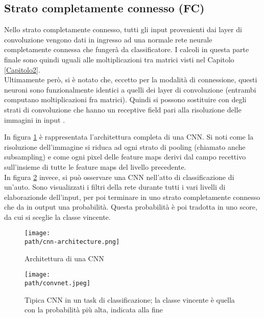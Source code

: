 \subsection{Strato completamente connesso (FC)}
Nello strato completamente connesso, tutti gli input provenienti dai layer di convoluzione vengono dati in ingresso ad una normale rete neurale completamente connessa che fungerà da classificatore. I calcoli in questa parte finale sono quindi uguali alle moltiplicazioni tra matrici visti nel Capitolo \ref{Capitolo2}. \\
Ultimamente però, si è notato che, eccetto per la modalità di connessione, questi neuroni sono funzionalmente identici a quelli dei layer di convoluzione (entrambi computano moltiplicazioni fra matrici). Quindi si possono sostituire con degli strati di convoluzione che hanno un receptive field pari alla risoluzione delle immagini in input \parencite{WCS231layer}. 

In figura \ref{fig:cnn4} è rappresentata l'architettura completa di una CNN. Si noti come la risoluzione dell'immagine si riduca ad ogni strato di pooling (chiamato anche subsampling) e come ogni pixel delle feature maps derivi dal campo recettivo sull'insieme di tutte le feature maps del livello precedente. \\
In figura \ref{fig:cnn3} invece, si può osservare una CNN nell'atto di classificazione di un'auto. Sono visualizzati i filtri della rete durante tutti i vari livelli di elaborazionde dell'input, per poi terminare in uno strato completamente connesso che da in output una probabilità. Questa probabilità è poi tradotta in uno score, da cui si sceglie la classe vincente. 
\begin{figure}[h!]
 \centering
 \texttt{[image: \\path/cnn-architecture.png]} 
 \caption{Architettura di una CNN}
 \label{fig:cnn4}
\end{figure}

\begin{figure}[h!]
 \centering
 \texttt{[image: \\path/convnet.jpeg]} 
 \caption{Tipica CNN in un task di classificazione; la classe vincente è quella con la probabilità più alta, indicata alla fine}
 \label{fig:cnn3}
\end{figure}
